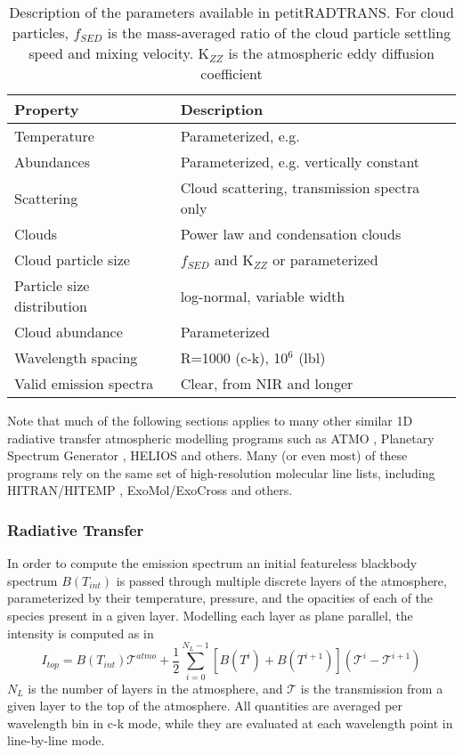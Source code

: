 \begin{table}[t]
	\centering
	\begin{tabular}{ll}
		\toprule
		\textbf{Property} & \textbf{Description}\\
		\midrule
		Temperature & Parameterized, e.g. \autocite{Guillot2010}\\
		Abundances & Parameterized, e.g. vertically constant\\
		Scattering & Cloud scattering, transmission spectra only\\
		Clouds & Power law and condensation clouds\\
		Cloud particle size & $f_{SED}$ and K$_{ZZ}$ or parameterized\\
		Particle size distribution & log-normal, variable width\\
		Cloud abundance & Parameterized\\
		Wavelength spacing & R=1000 (c-k), 10$^{6}$ (lbl)\\
		Valid emission spectra & Clear, from NIR and longer\\
		\bottomrule
	\end{tabular}
	\caption{Description of the parameters available in petitRADTRANS. For cloud particles, $f_{SED}$ is the mass-averaged ratio of the cloud particle settling speed and mixing velocity. K$_{ZZ}$ is the atmospheric eddy diffusion coefficient \autocite{Ackerman2001}}
	\label{tab:petitradparams}
\end{table}

Note that much of the following sections applies to many other similar 1D radiative transfer atmospheric modelling programs such as ATMO \autocite{Goyal2018}, Planetary Spectrum Generator \autocite{Villanueva2018}, HELIOS \autocite{Malik2017,Malik2019} and others.
Many (or even most) of these programs rely on the same set of high-resolution molecular line lists, including HITRAN/HITEMP \autocite{Rothman1973,Rothman2010,Gordon2017}, ExoMol/ExoCross \autocite{Tennyson2016,Tennyson2016a,Yurchenko2018} and others. 
\cite{Behmard2019}%
\cite{Guillot2010} %
\cite{Molliere2019} %
\subsubsection{Radiative Transfer}
In order to compute the emission spectrum an initial featureless blackbody spectrum $B(T_{int})$ is passed through multiple discrete layers of the atmosphere, parameterized by their temperature, pressure, and the opacities of each of the species present in a given layer.
Modelling each layer as plane parallel, the intensity is computed as in \autocite{Irwin2008,Molliere2017,Molliere2019}
\begin{equation}
I_{top} = B(T_{int})\mathcal{T}^{atmo} + \frac{1}{2}\sum_{i=0}^{N_{L}-1}\left[B(T^{i}) + B(T^{i+1})\right]\left(\mathcal{T}^{i}-\mathcal{T}^{i+1}\right)
\end{equation}
$N_{L}$ is the number of layers in the atmosphere, and $\mathcal{T}$ is the transmission from a given layer to the top of the atmosphere. All quantities are averaged per wavelength bin in c-k mode, while they are evaluated at each wavelength point in line-by-line mode.
